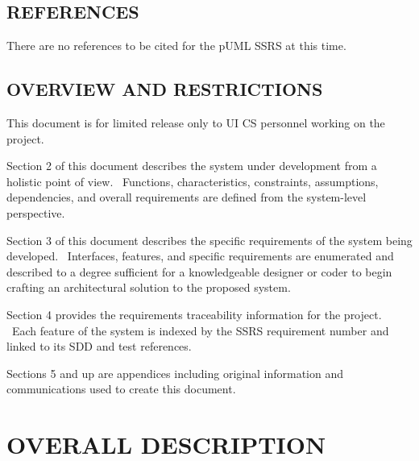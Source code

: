 \documentclass[twoside,letterpaper]{article}
\begin{document}
\subsection[REFERENCES]{\rmfamily\bfseries\color{black}
REFERENCES}
{\color{black}
There are no references to be cited for the pUML SSRS at this time.}

\subsection[OVERVIEW AND RESTRICTIONS]{\rmfamily\bfseries\color{black}
OVERVIEW AND RESTRICTIONS}
{\color{black}
This document is for limited release only to UI CS personnel working on
the project.}


\bigskip

{\color{black}
Section 2 of this document describes the system under development from a
holistic point of view. \ Functions, characteristics, constraints,
assumptions, dependencies, and overall requirements are defined from
the system-level perspective.}


\bigskip

{\color{black}
Section 3 of this document describes the specific requirements of the
system being developed. \ Interfaces, features, and specific
requirements are enumerated and described to a degree sufficient for a
knowledgeable designer or coder to begin crafting an architectural
solution to the proposed system.}


\bigskip

{\color{black}
Section 4 provides the requirements traceability information for the
project. \ Each feature of the system is indexed by the SSRS
requirement number and linked to its SDD and test references.}


\bigskip

{\color{black}
Sections 5 and up are appendices including original information and
communications used to create this document.}











\clearpage\section[OVERALL DESCRIPTION]{\rmfamily\bfseries\color{black}
OVERALL DESCRIPTION}
\end{document}
